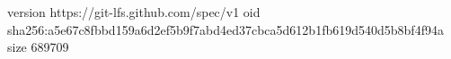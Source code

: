 version https://git-lfs.github.com/spec/v1
oid sha256:a5e67c8fbbd159a6d2ef5b9f7abd4ed37cbca5d612b1fb619d540d5b8bf4f94a
size 689709
